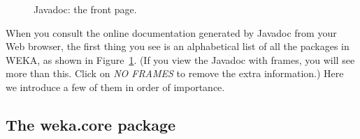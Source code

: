 \begin{figure}[!thp]
\caption{\label{fig:javadoc_a}Javadoc: the front page.}
\end{figure}


When you consult the online documentation generated by Javadoc from
your Web browser, the first thing you see is an alphabetical list of
all the packages in WEKA, as shown in Figure~\ref{fig:javadoc_a}. (If
you view the Javadoc with frames, you will see more than this. Click
on \textit{NO FRAMES} to remove the extra information.) Here we
introduce a few of them in order of importance.

\subsection{The weka.core package}

